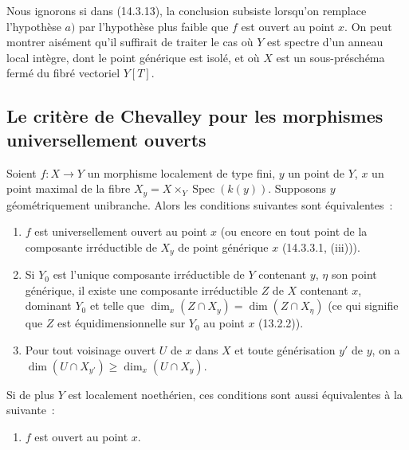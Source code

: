 \begin{remark}[14.3.14]
\label{IV.14.3.14-fr}
Nous ignorons si dans (14.3.13), la conclusion subsiste lorsqu'on remplace
l'hypothèse $a)$ par l'hypothèse plus faible que $f$ est ouvert au point $x$. On
peut montrer aisément qu'il suffirait de traiter le cas où $Y$ est spectre d'un
anneau local intègre, dont le point générique est isolé, et où $X$ est un
sous-préschéma fermé du fibré vectoriel $Y[T]$.
\end{remark}

\subsection{Le critère de Chevalley pour les morphismes universellement ouverts}
\label{subsection:IV.14.4-fr}

\begin{theorem}[14.4.1]
Soient $f:X\to Y$ un morphisme localement de type fini, $y$ un point de $Y$, $x$
un point maximal de la fibre $X_y=X\times_Y\operatorname{Spec}(k(y))$. Supposons
$y$ géométriquement unibranche. Alors les conditions suivantes sont équivalentes~:
\begin{enumerate}[label=\emph{\alph*)}]
  \item $f$ est universellement ouvert au point $x$ (ou encore en tout point de la
  composante irréductible de $X_y$ de point générique $x$ (14.3.3.1, (iii))).


  \item Si $Y_0$ est l'unique composante irréductible de $Y$ contenant $y$, $\eta$
  son point générique, il existe une composante irréductible $Z$ de $X$ contenant
  $x$, dominant $Y_0$ et telle que
  $\dim_x(Z\cap X_y)=\dim(Z\cap X_\eta)$ (ce qui signifie que $Z$ est
  équidimensionnelle sur $Y_0$ au point $x$ (13.2.2)).
  \item[b$'$)] Pour tout voisinage ouvert $U$ de $x$ dans $X$ et toute
  générisation $y'$ de $y$, on a
  $\dim(U\cap X_{y'})\geq\dim_x(U\cap X_y)$.
\end{enumerate}
Si de plus $Y$ est localement noethérien, ces conditions sont aussi équivalentes à
la suivante~:
\begin{enumerate}[label=\emph{\alph*)}]
  \item[c)] $f$ est ouvert au point $x$.
\end{enumerate}
\end{theorem}

